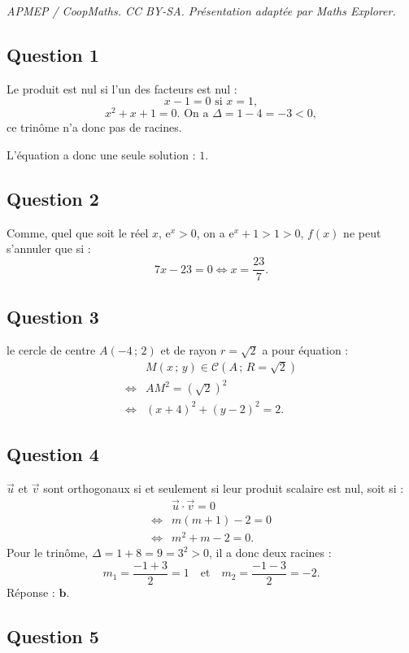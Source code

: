 \documentclass[10pt]{article}
\providecommand{\e}{{\mathrm{e}}}
\begin{document}
\noindent\textit{APMEP / CoopMaths. CC BY-SA. Présentation adaptée par Maths Explorer.}\par\medskip
\subsection*{Question 1}

Le produit est nul si l'un des facteurs est nul :
\[
x - 1 = 0 \text{ si } x = 1,
\]
\[
x^2 + x + 1 = 0. \text{ On a } \Delta = 1 - 4 = -3 < 0,
\]
ce trinôme n'a donc pas de racines.

L'équation a donc une seule solution : \(1\).

\subsection*{Question 2}

Comme, quel que soit le réel \(x\), \(\e^x > 0\), on a \(\e^x + 1 > 1 > 0\), \(f(x)\) ne peut s'annuler que si : \[
7x - 23 = 0 \iff x = \dfrac{23}{7}.
\]

\subsection*{Question 3}

le cercle de centre \(A(-4\,;\,2)\) et de rayon \(r = \sqrt{2}\) a pour équation :
\begin{align*}
&M(x\,;\,y) \in \mathcal{C}(A\,;\,R = \sqrt{2}) \\
\iff &AM^2 = (\sqrt{2})^2 \\
\iff &(x + 4)^2 + (y - 2)^2 = 2.
\end{align*}

\subsection*{Question 4}
 
\(\vec{u}\) et \(\vec{v}\) sont orthogonaux si et seulement si leur produit scalaire est nul, soit si :
\begin{align*}
&\vec{u} \cdot \vec{v} = 0 \\
\iff &m(m + 1) - 2 = 0 \\
\iff &m^2 + m - 2 = 0.
\end{align*}
Pour le trinôme, \(\Delta = 1 + 8 = 9 = 3^2 > 0\), il a donc deux racines :
\[
m_1 = \dfrac{-1 + 3}{2} = 1 \quad \text{et} \quad m_2 = \dfrac{-1 - 3}{2} = -2.
\]
Réponse : \(\textbf{b.}\)

\subsection*{Question 5}
\end{document}

